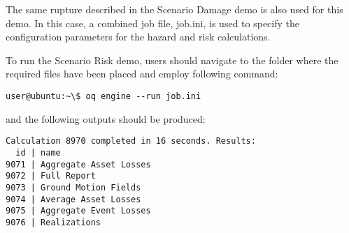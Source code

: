 The same rupture described in the Scenario Damage demo is also used for this
demo. In this case, a combined job file, job.ini, is used to specify the
configuration parameters for the hazard and risk calculations.

To run the Scenario Risk demo, users should navigate to the folder where the
required files have been placed and employ following command:

\begin{verbatim}
user@ubuntu:~\$ oq engine --run job.ini
\end{verbatim}

and the following outputs should be produced:

\begin{verbatim}
Calculation 8970 completed in 16 seconds. Results:
  id | name
9071 | Aggregate Asset Losses
9072 | Full Report
9073 | Ground Motion Fields
9074 | Average Asset Losses
9075 | Aggregate Event Losses
9076 | Realizations
\end{verbatim}

